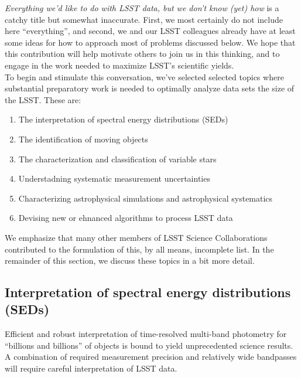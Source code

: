 \documentclass{iau}
\begin{document}
{\it Everything we'd like to do with LSST data, but we don’t know
  (yet) how} is a catchy title but somewhat inaccurate. First, we most
certainly do not include here ``everything'', and second, we and our
LSST colleagues already have at least some ideas for how to approach
most of problems discussed below.  We hope that this contribution will
help motivate others to join us in this thinking, and to engage in
the work needed to maximize LSST's scientific yields.\\

To begin and stimulate this conversation, we've selected selected topics where substantial
preparatory work is needed to optimally analyze data sets the size of the
LSST. These are:
\begin{enumerate}
\item The interpretation of spectral energy distributions (SEDs)
\item The identification of moving objects
\item The characterization and classification of variable stars 
\item Understadning systematic measurement uncertainties
\item Characterizing astrophysical simulations and astrophysical
  systematics
\item Devising new or ehnanced algorithms to process LSST data\\
\end{enumerate}

We emphasize that many other members of LSST Science Collaborations contributed to
the formulation of this, by all means, incomplete list. In the remainder of this section, 
we discuss these topics in a bit more detail. 


\subsection{Interpretation of spectral energy distributions (SEDs)}

Efficient and robust interpretation of time-resolved multi-band photometry for “billions and 
billions” of objects is bound to yield unprecedented science results. A combination of 
required measurement precision and relatively wide bandpasses will require careful
interpretation of LSST data. 
\end{document}
